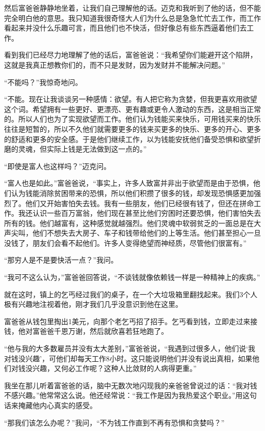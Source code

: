 然后富爸爸静静地坐着，让我们自己理解他的话。迈克和我听到了他的话，但不能完全明白他的意思。我只知道我很奇怪大人们为什么总是急急忙忙去工作，而工作看起来并没什么乐趣可言，而且他们也不快活，但好像总有些东西逼着他们去工作。

看到我们已经尽力地理解了他的话后，富爸爸说：“我希望你们能避开这个陷阱，这就是我真正想教你们的，而不只是发财，因为发财并不能解决问题。”

“不能吗？”我惊奇地问。

“不能。现在让我谈谈另一种感情：欲望。有人把它称为贪婪，但我更喜欢用欲望这个词。希望拥有一些更好、更漂亮、更有趣或更令人激动的东西，这是相当正常的。所以人们也为了实现欲望而工作。他们认为钱能买来快乐，可用钱买来的快乐往往是短暂的，所以不久他们就需要更多的钱来买更多的快乐、更多的开心、更多的舒适和更多的安全感。于是他们继续工作，以为钱能安抚他们备受恐惧和欲望折磨的灵魂，但实际上钱是无法做到这一点的。”

“即使是富人也这样吗？”迈克问。

“富人也是如此。”富爸爸说，“事实上，许多人致富并非出于欲望而是由于恐惧，他们认为钱能消除贫困带来的恐惧，所以他们积攒了很多的钱，却发现恐惧感更加强烈了。他们又开始害怕失去钱。我有一些朋友，他们已经很有钱了，但还在拼命工作。我还认识一些百万富翁，他们现在甚至比他们穷困时还要恐惧，他们害怕失去所有的钱。他们越富有，这种感觉就越强烈。他们灵魂中软弱贫乏的一面总是在大声尖叫，他们不想失去大房子、车子和钱带给他们的上等生活。他们甚至担心一旦没钱了，朋友们会看不起他们。许多人变得绝望而神经质，尽管他们很富有。”

“那穷人是不是要快活一点？”我问。

“我可不这么认为，”富爸爸回答说，“不谈钱就像依赖钱一样是一种精神上的疾病。”

就在这时，镇上的乞丐经过我们的桌子，在一个大垃圾箱里翻找起来。我们3个人极有兴趣地注视着他，刚才我们几乎没意识到他在这里。

富爸爸从钱包里掏出1美元，向那个老乞丐招了招手。乞丐看到钱，立即走过来接钱，他对富爸爸千恩万谢，然后就欣喜若狂地跑了。

“他与我的大多数雇员并没有太大差别，”富爸爸说，“我遇到过很多人，他们说‘我对钱没兴趣’，可他们却每天工作8小时。这只能说明他们并没有说出真相，如果他们对钱没兴趣，又何必工作呢？这种人比敛财的人病得更重。”

我坐在那儿听着富爸爸的话，脑中无数次地闪现我的亲爸爸曾说过的话：“我对钱不感兴趣。”他常常这么说。他还经常说：“我工作是因为我热爱这个职业。”用这句话来掩藏他内心真实的感受。

“那我们该怎么办呢？”我问，“不为钱工作直到不再有恐惧和贪婪吗？”

